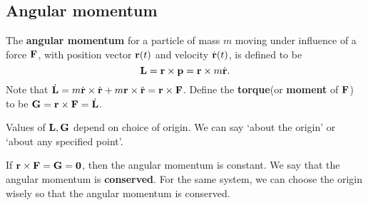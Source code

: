 \subsection{Angular momentum}
\begin{definition}
    The \textbf{angular momentum} for a particle of mass $m$ moving under influence of a force $ {\bf F} $, with position vector ${\bf r}(t)$ and velocity $ \dot{{\bf r}}(t) $, is defined to be 
    \[
        {\bf L} = {\bf r} \times {\bf p} = {\bf r} \times m \dot{{\bf r}}.
    \]
    Note that $ \dot{{\bf L}} = m \dot{{\bf r}}\times \dot{{\bf r}}+m{\bf r} \times \ddot{{\bf r}} = {\bf r} \times {\bf F} $. Define the \textbf{torque}(or \textbf{moment} of ${\bf F}$) to be $ {\bf G} = {\bf r} \times {\bf F} = \dot{{\bf L}} $.
\end{definition}
\begin{note}
    Values of $ {\bf L},{\bf G} $ depend on choice of origin. We can say `about the origin' or `about any specified point'.
\end{note}
\begin{note}
    If $ {\bf r} \times {\bf F} ={\bf G}= \mathbf{0} $, then the angular momentum is constant. We say that the angular momentum is \textbf{conserved}. For the same system, we can choose the origin wisely so that the angular momentum is conserved.
\end{note}